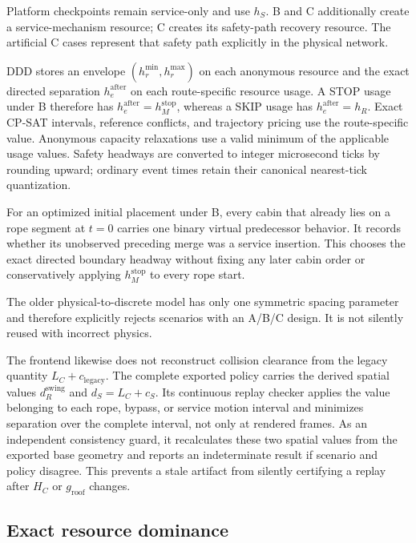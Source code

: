 \documentclass[11pt,a4paper]{scrartcl}
\begin{document}
Platform checkpoints remain service-only and use $h_S$.  B and C additionally
create a service-mechanism resource; C creates its safety-path recovery
resource.  The artificial C cases represent that safety path explicitly in the
physical network.

DDD stores an envelope
$(h_r^{\min},h_r^{\max})$ on each anonymous resource and the exact directed
separation $h_{e}^{\mathrm{after}}$ on each route-specific resource usage.  A
STOP usage under B therefore has
$h_e^{\mathrm{after}}=h_M^{\mathrm{stop}}$, whereas a SKIP usage has
$h_e^{\mathrm{after}}=h_R$.  Exact CP-SAT intervals, reference conflicts, and
trajectory pricing use the route-specific value.  Anonymous capacity
relaxations use a valid minimum of the applicable usage values.  Safety
headways are converted to integer microsecond ticks by rounding upward;
ordinary event times retain their canonical nearest-tick quantization.

For an optimized initial placement under B, every cabin that already lies on a
rope segment at $t=0$ carries one binary virtual predecessor behavior.  It
records whether its unobserved preceding merge was a service insertion.  This
chooses the exact directed boundary headway without fixing any later cabin
order or conservatively applying $h_M^{\mathrm{stop}}$ to every rope start.

The older physical-to-discrete model has only one symmetric spacing parameter
and therefore explicitly rejects scenarios with an A/B/C design.  It is not
silently reused with incorrect physics.

The frontend likewise does not reconstruct collision clearance from the legacy
quantity $L_C+c_{\mathrm{legacy}}$.  The complete exported policy carries the
derived spatial values $d_R^{\mathrm{swing}}$ and $d_S=L_C+c_S$.  Its continuous
replay checker applies the value belonging to each rope, bypass, or service
motion interval and minimizes separation over the complete interval, not only
at rendered frames.  As an independent consistency guard, it recalculates these
two spatial values from the exported base geometry and reports an indeterminate
result if scenario and policy disagree.  This prevents a stale artifact from
silently certifying a replay after $H_C$ or $g_{\mathrm{roof}}$ changes.

\subsection{Exact resource dominance}
\end{document}
